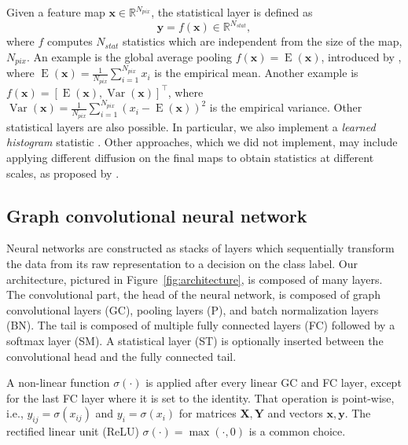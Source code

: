 \documentclass[final,twocolumn,3p,times,authoryear]{elsarticle}
\newcommand{\figref}[1]{Figure~\ref{fig:#1}}
\renewcommand{\b}[1]{{\bm{#1}}}   %
\newcommand{\1}{\b{1}}              %
\newcommand{\0}{\b{0}}              %
\newcommand{\x}{\b{x}}
\newcommand{\X}{\b{X}}
\newcommand{\y}{\b{y}}
\newcommand{\Y}{\b{Y}}
\newcommand{\trans}{^\intercal}
\newcommand{\R}{\mathbb{R}}
\DeclareMathOperator*{\esp}{E}
\DeclareMathOperator*{\var}{Var}
\begin{document}
Given a feature map $\x \in \R^{N_{pix}}$, the statistical layer is defined as
\begin{equation} \label{eqn:stat_layer}
	\y = f(\x) \in \R^{N_{stat}},
\end{equation}
where $f$ computes $N_{stat}$ statistics which are independent from the size of the map, $N_{pix}$. An example is the global average pooling $f(\x) = \esp(\x)$, introduced by \citet{lin2013globalavgpooling}, where $\esp(\x) = \frac{1}{N_{pix}} \sum_{i=1}^{N_{pix}} x_i$ is the empirical mean. Another example is $f(\x) = [\esp(\x), \var(\x)]\trans$, where $\var(\x) = \frac{1}{N_{pix}} \sum_{i=1}^{N_{pix}} (x_i - \esp(\x))^2$ is the empirical variance.
Other statistical layers are also possible.
In particular, we also implement a \emph{learned histogram} statistic \citep{wang2016learnhist}.
Other approaches, which we did not implement, may include applying different diffusion on the final maps to obtain statistics at different scales, as proposed by \citep{khasanova2017tigranet}.

\subsection{Graph convolutional neural network}
\label{sec:architecture}

Neural networks are constructed as stacks of layers which sequentially transform the data from its raw representation to a decision on the class label. Our architecture, pictured in \figref{architecture}, is composed of many layers. The convolutional part, the head of the neural network, is composed of graph convolutional layers (GC), pooling layers (P), and batch normalization layers (BN). The tail is composed of multiple fully connected layers (FC) followed by a softmax layer (SM). A statistical layer (ST) is optionally inserted between the convolutional head and the fully connected tail.

A non-linear function $\sigma(\cdot)$ is applied after every linear GC and FC layer, except for the last FC layer where it is set to the identity. That operation is point-wise, i.e., $y_{ij} = \sigma(x_{ij})$ and $y_i = \sigma(x_i)$ for matrices $\X, \Y$ and vectors $\x, \y$. The rectified linear unit (ReLU) $\sigma(\cdot) = \max(\cdot, 0)$ is a common choice.
\end{document}
